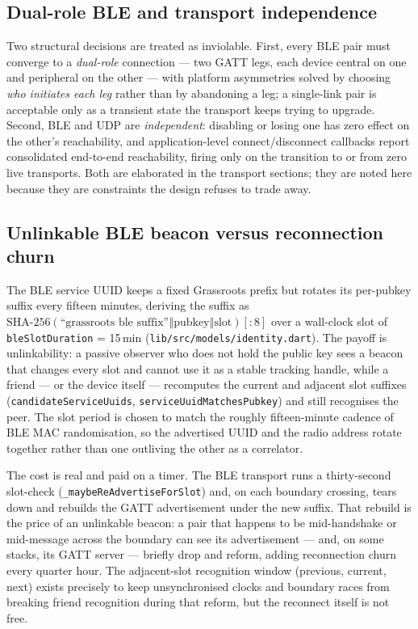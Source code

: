 \documentclass[11pt]{report}
\newcommand{\code}[1]{\texttt{\small #1}}
\begin{document}
\subsection{Dual-role BLE and transport independence}

Two structural decisions are treated as inviolable. First, every BLE pair must converge to a \emph{dual-role} connection --- two GATT legs, each device central on one and peripheral on the other --- with platform asymmetries solved by choosing \emph{who initiates each leg} rather than by abandoning a leg; a single-link pair is acceptable only as a transient state the transport keeps trying to upgrade. Second, BLE and UDP are \emph{independent}: disabling or losing one has zero effect on the other's reachability, and application-level connect/disconnect callbacks report consolidated end-to-end reachability, firing only on the transition to or from zero live transports. Both are elaborated in the transport sections; they are noted here because they are constraints the design refuses to trade away.

\subsection{Unlinkable BLE beacon versus reconnection churn}

The BLE service UUID keeps a fixed Grassroots prefix but rotates its per-pubkey suffix every fifteen minutes, deriving the suffix as $\text{SHA-256}(\text{``grassroots ble suffix''} \mathbin\Vert \text{pubkey} \mathbin\Vert \text{slot})[:8]$ over a wall-clock slot of \code{bleSlotDuration} = 15\,min (\code{lib/src/models/identity.dart}). The payoff is unlinkability: a passive observer who does not hold the public key sees a beacon that changes every slot and cannot use it as a stable tracking handle, while a friend --- or the device itself --- recomputes the current and adjacent slot suffixes (\code{candidateServiceUuids}, \code{serviceUuidMatchesPubkey}) and still recognises the peer. The slot period is chosen to match the roughly fifteen-minute cadence of BLE MAC randomisation, so the advertised UUID and the radio address rotate together rather than one outliving the other as a correlator.

The cost is real and paid on a timer. The BLE transport runs a thirty-second slot-check (\code{\_maybeReAdvertiseForSlot}) and, on each boundary crossing, tears down and rebuilds the GATT advertisement under the new suffix. That rebuild is the price of an unlinkable beacon: a pair that happens to be mid-handshake or mid-message across the boundary can see its advertisement --- and, on some stacks, its GATT server --- briefly drop and reform, adding reconnection churn every quarter hour. The adjacent-slot recognition window (previous, current, next) exists precisely to keep unsynchronised clocks and boundary races from breaking friend recognition during that reform, but the reconnect itself is not free.
\end{document}

